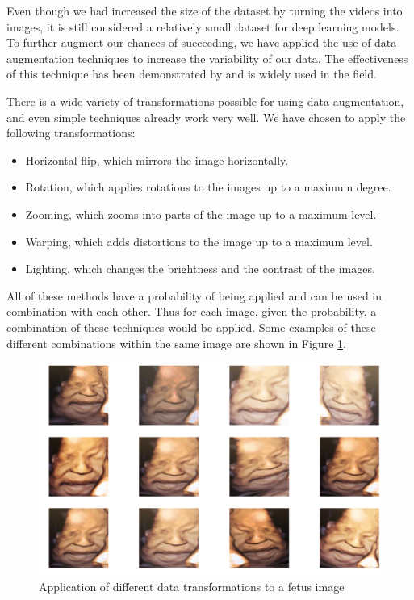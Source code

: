 Even though we had increased the size of the dataset by turning the videos into images, it is still considered a relatively small dataset for deep learning models. To further augment our chances of succeeding, we have applied the use of data augmentation techniques to increase the variability of our data. The effectiveness of this technique has been demonstrated by \cite{abs-1712-04621} and is widely used in the field.

There is a wide variety of transformations possible for using data augmentation, and even simple techniques already work very well. We have chosen to apply the following transformations:

\begin{itemize}
    \item Horizontal flip, which mirrors the image horizontally. 
    \item Rotation, which applies rotations to the images up to a maximum degree.
    \item Zooming, which zooms into parts of the image up to a maximum level.
    \item Warping, which adds distortions to the image up to a maximum level.
    \item Lighting, which changes the brightness and the contrast of the images.
\end{itemize}

All of these methods have a probability of being applied and can be used in combination with each other. Thus for each image, given the probability, a combination of these techniques would be applied. Some examples of these different combinations within the same image are shown in Figure \ref{fig:data_augmentation}.

\begin{figure}[h!tp]
    \centering
    \includegraphics[width=.95\textwidth]{imgs/chap5_data_augmentation.png}
    \caption{Application of different data transformations to a fetus image}
    \label{fig:data_augmentation}
\end{figure}

